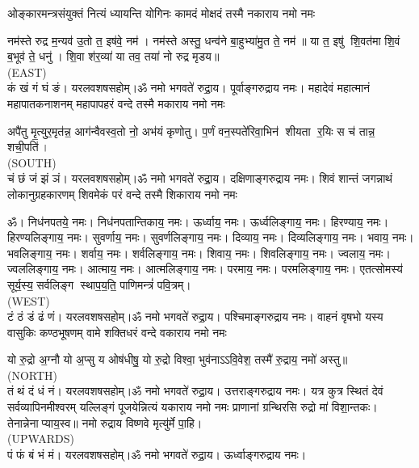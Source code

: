 


\twolineshloka
{ओङ्कारमन्त्रसंयुक्तं नित्यं ध्यायन्ति योगिनः}
{कामदं मोक्षदं तस्मै नकाराय नमो नमः}

नम॑स्ते रुद्र म॒न्यव॑ उ॒तो त॒ इष॑वे॒ नम॑। नम॑स्ते अस्तु॒ धन्व॑ने बा॒हुभ्या॑मु॒त ते॒ नम॑॥ या त॒ इषु॑ शि॒वत॑मा शि॒वं ब॒भूव॑ ते॒ धनु॑। शि॒वा श॑र॒व्या॑ या तव॒ तया॑ नो रुद्र मृडय॥\\
{\scriptsize (EAST)}\\
कं खं गं घं ङं। यरलवशषसहोम्।ॐ नमो भगवते॑ रुद्रा॒य। पूर्वाङ्गरुद्राय नमः। 
\medskip
\twolineshloka
{महादेवं महात्मानं महापातकनाशनम्}
{महापापहरं वन्दे तस्मै मकाराय नमो नमः}

अपै॑तु मृ॒त्युर॒मृत॑न्न॒ आग॑न्वैवस्व॒तो नो॒ अभ॑यं कृणोतु।
प॒र्णं वन॒स्पते॑रिवा॒भिन॑ शीयता र॒यिः स च॑ तान्न॒ शची॒पति॑।\\
{\scriptsize (SOUTH)}\\
चं छं जं झं ञं। यरलवशषसहोम्।ॐ नमो भगवते॑ रुद्रा॒य। दक्षिणाङ्गरुद्राय नमः।
\medskip
\twolineshloka
{शिवं शान्तं जगन्नाथं लोकानुग्रहकारणम्}
{शिवमेकं परं वन्दे तस्मै शिकाराय नमो नमः}

ॐ। निध॑नपतये॒ नमः। निध॑नपतान्तिकाय॒ नमः। ऊर्ध्वाय॒ नमः। ऊर्ध्वलिङ्गाय॒ नमः। हिरण्याय॒ नमः। हिरण्यलिङ्गाय॒ नमः। सुवर्णाय॒ नमः। सुवर्णलिङ्गाय॒ नमः। दिव्याय॒ नमः। दिव्यलिङ्गाय॒ नमः। भवाय॒ नमः। भवलिङ्गाय॒ नमः। शर्वाय॒ नमः। शर्वलिङ्गाय॒ नमः। शिवाय॒ नमः। शिवलिङ्गाय॒ नमः। ज्वलाय॒ नमः। ज्वललिङ्गाय॒ नमः। आत्माय॒ नमः। आत्मलिङ्गाय॒ नमः। परमाय॒ नमः। परमलिङ्गाय॒ नमः। एतत्सोमस्य॑ सूर्य॒स्य॒ सर्वलिङ्ग स्थाप॒य॒ति॒ पाणिमन्त्रं॑ पवि॒त्रम्।\\
{\scriptsize (WEST)}\\
टं ठं डं ढं णं। यरलवशषसहोम्।ॐ नमो भगवते॑ रुद्रा॒य। पश्चिमाङ्गरुद्राय नमः।
\medskip
\twolineshloka
{वाहनं वृषभो यस्य वासुकिः कण्ठभूषणम्}
{वामे शक्तिधरं वन्दे वकाराय नमो नमः}

यो रु॒द्रो अ॒ग्नौ यो अ॒प्सु य ओष॑धीषु॒ यो रु॒द्रो विश्वा॒ भुव॑नाऽऽवि॒वेश॒ तस्मै॑ रु॒द्राय॒ नमो॑ अस्तु॥ \\
{\scriptsize (NORTH)}\\
तं थं दं धं नं। यरलवशषसहोम्।ॐ नमो भगवते॑ रुद्रा॒य। उत्तराङ्गरुद्राय नमः।
\medskip
\twolineshloka
{यत्र कुत्र स्थितं देवं सर्वव्यापिनमीश्वरम्}
{यल्लिङ्गं पूजयेन्नित्यं यकाराय नमो नमः}
प्राणानां ग्रन्थिरसि रुद्रो मा॑ विशा॒न्तकः। तेनान्नेनाप्याय॒स्व॥ नमो रुद्राय विष्णवे मृत्यु॑र्मे पा॒हि।\\
{\scriptsize (UPWARDS)}\\
पं फं बं भं मं। यरलवशषसहोम्।ॐ नमो भगवते॑ रुद्रा॒य। ऊर्ध्वाङ्गरुद्राय नमः।

